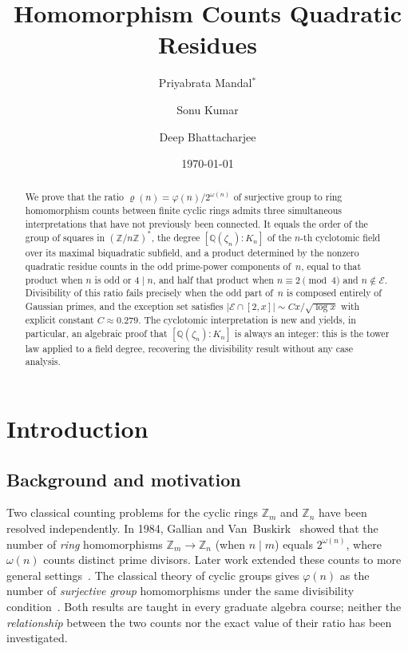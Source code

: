 \documentclass[12pt]{amsart}
\title[Homomorphism Counts Quadratic Residues]
      {\large\bfseries Homomorphism Counts Quadratic Residues}
\author[Mandal]{Priyabrata Mandal$^*$}
\author[Kumar]{Sonu Kumar}
\author[Bhattacharjee]{Deep Bhattacharjee}
\date{\today}
\theoremstyle{bluehead}
\theoremstyle{orangehead}
\theoremstyle{greenhead}
\newcommand{\Z}{\mathbb{Z}}
\newcommand{\Q}{\mathbb{Q}}
\renewcommand{\phi}{\varphi}
\begin{document}
\begin{abstract}
We prove that the ratio $\varrho(n)=\phi(n)/2^{\omega(n)}$ of surjective
group to ring homomorphism counts between finite cyclic rings admits
three simultaneous interpretations that have not previously been connected.
It equals the order of the group of squares in $(\Z/n\Z)^*$, the degree
$[\Q(\zeta_n):K_n]$ of the $n$-th cyclotomic field over its maximal
biquadratic subfield, and a product determined by the nonzero quadratic residue counts
in the odd prime-power components of~$n$, equal to that product
when $n$ is odd or $4\mid n$, and half that product when
$n\equiv2\pmod{4}$ and $n\notin\mathcal{E}$.
Divisibility of this ratio fails precisely when the odd part of~$n$ is
composed entirely of Gaussian primes, and the exception set satisfies
$|\mathcal{E}\cap[2,x]|\sim Cx/\sqrt{\log x}$ with explicit constant
$C\approx0.279$.
The cyclotomic interpretation is new and yields, in particular, an
algebraic proof that $[\Q(\zeta_n):K_n]$ is always an integer:
this is the tower law applied to a field degree, recovering the
divisibility result without any case analysis.
\end{abstract}



\maketitle
{}

\section{Introduction}

\subsection*{Background and motivation}

Two classical counting problems for the cyclic rings
$\Z_m$ and $\Z_n$ have been resolved independently.
In 1984, Gallian and Van~Buskirk~\cite{gallian84} showed that the number
of \emph{ring} homomorphisms $\Z_m\to\Z_n$ (when $n\mid m$) equals
$2^{\omega(n)}$, where $\omega(n)$ counts distinct prime divisors.
Later work extended these counts to more general settings~\cite{diaz2015,ashrafi2024}.
The classical theory of cyclic groups gives $\phi(n)$ as the number of
\emph{surjective group} homomorphisms under the same divisibility
condition~\cite{dummit2004abstract}.
Both results are taught in every graduate algebra course; neither the
\emph{relationship} between the two counts nor the exact value of their
ratio has been investigated.
\end{document}
